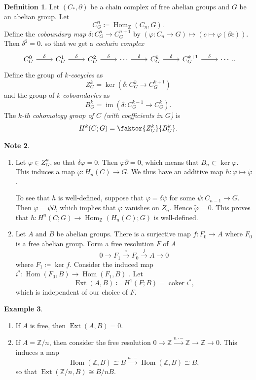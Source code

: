 \documentclass[10pt,letterpaper,cm]{nupset}
\theoremstyle{definition}
\newtheorem{definition}{Definition}[subsection]
\newtheorem{exmp}[definition]{Example}
\newtheorem{note}[definition]{Note}
\theoremstyle{theorem}
\theoremstyle{remark}
\newcommand{\Z}{\mathbb Z}
\newcommand{\1}{\mathbb{1}}
\newcommand{\0}{\vec 0}
\DeclareMathOperator{\im}{im}
\DeclareMathOperator{\ext}{Ext}
\DeclareMathOperator{\Hom}{Hom}
\DeclareMathOperator{\coker}{coker}
\begin{document}
\begin{definition} 
Let $(C_{\ast}, \partial)$ be a chain complex of free abelian groups and $G$ be an abelian group. Let $$C_G^n \coloneqq  \Hom_{\Z}(C_n, G).$$ Define the \textit{coboundary map} $\delta : C_G^n \to C_G^{n+1}$ by $(\varphi : C_n \to G) \mapsto (c\mapsto \varphi(\partial{c}))$. Then $\delta^2 =0$. so that we get a \textit{cochain complex}
\[
\begin{tikzcd}
C_G^0 \arrow[r, "\delta"] & C_G^1 \arrow[r, "\delta"] & C_G^2 \arrow[r, "\delta"] & \cdots \arrow[r, "\delta"] & C_G^k \arrow[r, "\delta"] & C_G^{k+1} \arrow[r, "\delta"] & \cdots
\end{tikzcd}.
.\] Define the group of \textit{$k$-cocycles} as  $$Z_G^k = \ker(\delta: C_G^k \to C_G^{k+1})$$ and the group of \textit{$k$-coboundaries} as $$ B_G^k = \im(\delta : C_G^{k-1} \to C_G^k)  .$$ The \textit{$k$-th cohomology group of $C$ (with coefficients in $G$)} is $$H^k(C; G) = \faktor{ Z_G^k  }{B_G^k   }  .$$
\end{definition}

\begin{note} $ $
\begin{enumerate}
\item Let $\varphi \in Z_G^n$, so that $\delta{\varphi}=0$. Then $\varphi{\partial} =0$, which means that $B_n\subset \ker{\varphi}$. This induces a map $\tilde{\varphi} : H_n(C) \to G$.  We thus have an additive map $h: \varphi \mapsto \tilde{\varphi}$.

To see that $h$ is well-defined, suppose that $\varphi = \delta{\psi}$ for some $\psi : C_{n-1} \to G$. Then $\varphi = \psi{\partial}$, which implies that $\varphi$ vanishes on $Z_n$. Hence $\tilde{\varphi} =0$. This proves that $h: H^n(C; G) \to  \Hom_{\Z}(H_n(C); G)$ is well-defined.
\item Let $A$ and $B$ be abelian groups. There is a surjective map $f: F_0 \to A$ where $F_0$ is a free abelian group. Form a free resolution $F$ of $A$ $$0 \to F_1 \overset{i}{\longrightarrow} F_0 \overset{f}{\longrightarrow} A \to 0$$ where $F_1 \coloneqq  \ker{f}$. Consider the induced map $i^{\ast} : \Hom(F_0, B) \to \Hom(F_1, B)$ . Let $$\ext(A, B) \coloneqq  H^1(F; B) = \coker{i^{\ast}},$$ which is independent of our choice of $F$.
\end{enumerate}
\end{note}

\begin{exmp} $ $
\begin{enumerate}
\item If $A$ is free, then $\ext(A, B) =0$. 
\item If $A = \Z/n$, then consider the free resolution $0 \to \Z \overset{n\cdot{-}}{\longrightarrow} \Z \to \Z \to 0$. This induces a map $$\Hom(\Z, B) \cong B \overset{n\cdot{-}}{\longrightarrow} \Hom(\Z, B) \cong B,$$ so that $\ext(\Z/n, B) \cong B/nB$.
\end{enumerate}
\end{exmp}
\end{document}
